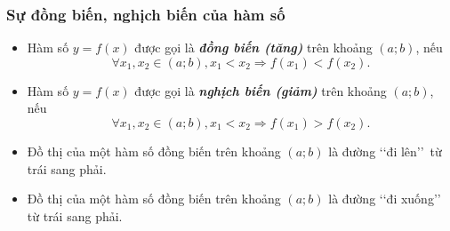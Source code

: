 \subsubsection{Sự đồng biến, nghịch biến của hàm số}
\begin{boxdn}\hfill
	\begin{itemize}
		\item Hàm số $y=f(x)$ được gọi là \textit{\textbf{đồng biến (tăng)}} trên khoảng $(a;b)$, nếu
		$$\forall x_1,x_2 \in (a;b), x_1 < x_2 \Rightarrow f\left(x_1\right) < f\left(x_2\right).$$
		\item Hàm số $y=f(x)$ được gọi là \textit{\textbf{nghịch biến (giảm)}} trên khoảng $(a;b)$, nếu
		$$\forall x_1,x_2 \in (a;b), x_1 < x_2 \Rightarrow f\left(x_1\right) > f\left(x_2\right).$$
	\end{itemize}
\end{boxdn}
\begin{note}\hfill
	\begin{itemize}
		\item Đồ thị của một hàm số đồng biến trên khoảng $(a;b)$ là đường \lq\lq đi lên\rq\rq\, từ trái sang phải.
		\item Đồ thị của một hàm số đồng biến trên khoảng $(a;b)$ là đường \lq\lq đi xuống\rq\rq\, từ trái sang phải.
	\end{itemize}
\end{note}

